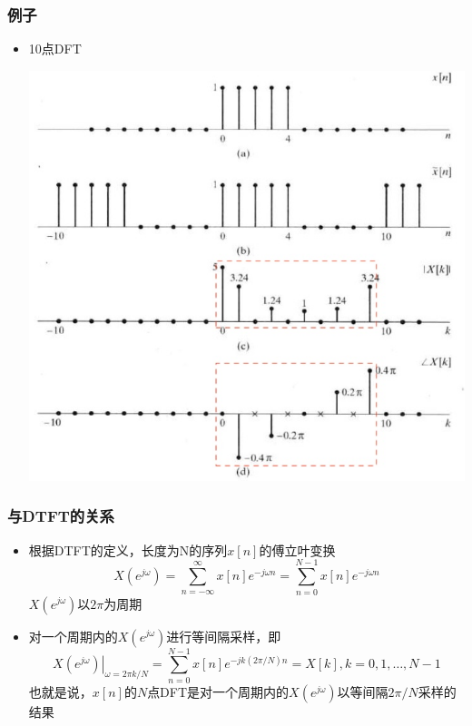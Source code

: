 \documentclass[CJKutf8,dvipsnames,table]{beamer}
\begin{document}
\begin{CJK*}{UTF8}{song}
  \begin{frame}
    \frametitle{例子}
    \begin{itemize}
	\item 10点DFT
		\begin{center}
      	\includegraphics[scale=.35]{dtsp-c-f8-11}
    	\end{center}	
	\end{itemize}
  \end{frame}  

  \begin{frame}
    \frametitle{与DTFT的关系}
    \begin{itemize}
	\item 根据DTFT的定义，长度为N的序列$x[n]$的傅立叶变换
	\[
		X(e^{j\omega}) = \sum_{n=-\infty}^{\infty}x[n]e^{-j\omega n} =  \sum_{n=0}^{N-1}x[n]e^{-j\omega n} 	
	\]
	$X(e^{j\omega})$以$2\pi$为周期
	\item 对一个周期内的$X(e^{j\omega})$进行等间隔采样，即
	\[
	\left. X(e^{j\omega}) \right\rvert_{\omega=2\pi k/N}	 = \sum_{n=0}^{N-1}x[n]e^{-jk(2\pi /N) n} = X[k], k=0, 1, \hdots, N-1
	\]	
	也就是说，{\color{red}$x[n]$的$N$点DFT是对一个周期内的$X(e^{j\omega})$以等间隔$2\pi/N$采样的结果}

	\end{itemize}
  \end{frame}      
    

\end{CJK*}
\end{document}
